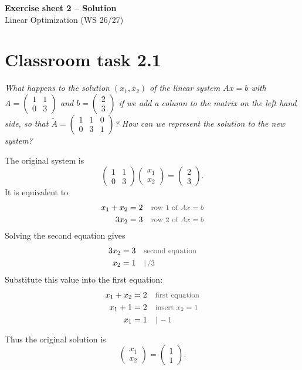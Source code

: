 \documentclass[a4paper,11pt]{article}
\newif\ifexplain
\newcommand{\blatttitel}[2]{\begin{center}{\Large\bfseries #1}\\[2pt]#2\end{center}}
\newcommand{\aufgabe}[1]{\section*{#1}}
\newcommand{\angabe}[1]{\textit{#1}\par\smallskip}
\newcommand{\why}[1]{\text{\small\color{black!65}#1}}
\newcommand{\explain}[1]{\ifexplain\begin{erklbox}#1\end{erklbox}\fi}
\begin{document}
\blatttitel{Exercise sheet 2 -- \ifexplain Explanation\else Solution\fi}{Linear Optimization (WS 26/27)}

\explain{Dieses Blatt behandelt drei Grundideen: Gleichungssysteme mit mehr Variablen als Gleichungen, die Standardform aus der Vorlesung und graphisches Lösen linearer Programme. Bei der Standardform im Skript wird ein Maximierungsproblem mit Gleichungen $Ax=b$ und Nichtnegativität $x\ge0$ verwendet.}

\aufgabe{Classroom task 2.1}
\angabe{What happens to the solution $(x_1,x_2)$ of the linear system $Ax=b$ with $A=\begin{pmatrix}1&1\\0&3\end{pmatrix}$ and $b=\begin{pmatrix}2\\3\end{pmatrix}$ if we add a column to the matrix on the left hand side, so that $\widetilde A=\begin{pmatrix}1&1&0\\0&3&1\end{pmatrix}$? How can we represent the solution to the new system?}
\explain{Zuerst lösen wir das alte System. Danach bekommt das neue System eine zusätzliche Variable $x_3$. Weil dann zwei Gleichungen und drei Variablen vorhanden sind, wird eine Variable als freier Parameter gewählt.}

The original system is
\[
\begin{pmatrix}1&1\\0&3\end{pmatrix}
\begin{pmatrix}x_1\\x_2\end{pmatrix}
=
\begin{pmatrix}2\\3\end{pmatrix}.
\]
It is equivalent to
\begin{align*}
x_1+x_2&=2 && \why{row $1$ of $Ax=b$}\\
3x_2&=3 && \why{row $2$ of $Ax=b$}
\end{align*}
Solving the second equation gives
\begin{align*}
3x_2&=3 && \why{second equation}\\
x_2&=1 && \why{$|\,/3$}
\end{align*}
Substitute this value into the first equation:
\begin{align*}
x_1+x_2&=2 && \why{first equation}\\
x_1+1&=2 && \why{insert $x_2=1$}\\
x_1&=1 && \why{$|\,-1$}
\end{align*}
\explain{Das alte System hat genau eine Lösung, weil die beiden Gleichungen zwei Variablen festlegen.}
Thus the original solution is
\[
\begin{pmatrix}x_1\\x_2\end{pmatrix}
=
\begin{pmatrix}1\\1\end{pmatrix}.
\]
\end{document}
